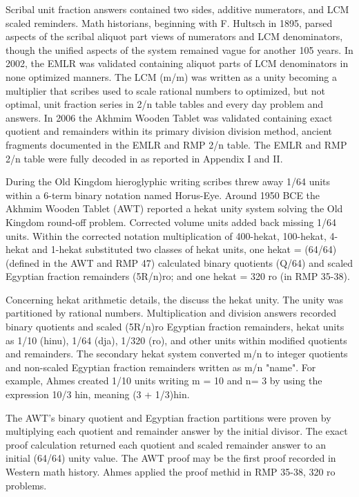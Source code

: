 \documentclass[12pt]{article}
\begin{document}
Scribal unit fraction answers contained two sides, additive numerators, and LCM scaled reminders. Math historians, beginning with F. Hultsch in 1895, parsed aspects of the scribal aliquot part views of numerators and LCM denominators, though the unified aspects of the system remained vague for another 105 years. In 2002, the EMLR was validated containing aliquot parts of LCM denominators in none optimized manners. The LCM (m/m) was written as a unity becoming a multiplier that scribes used to scale rational numbers to optimized, but not optimal, unit fraction series in 2/n table tables and every day problem and answers. In 2006 the Akhmim Wooden Tablet was validated containing exact quotient and remainders within its primary division division method,  ancient fragments documented in the EMLR and RMP 2/n table. The EMLR and RMP 2/n table were fully decoded in  as reported in Appendix I and II.

During the Old Kingdom hieroglyphic writing scribes threw away 1/64 units within a 6-term binary notation named Horus-Eye. Around 1950 BCE the Akhmim Wooden Tablet (AWT) reported a hekat unity system solving the Old Kingdom round-off problem. Corrected volume units added back missing 1/64 units. Within the corrected notation multiplication of 400-hekat, 100-hekat, 4-hekat and 1-hekat substituted two classes of hekat units, one hekat = (64/64) (defined in the AWT and RMP 47) calculated binary quotients (Q/64) and scaled Egyptian fraction remainders (5R/n)ro; and one hekat = 320 ro (in RMP 35-38).
 
Concerning hekat arithmetic details, the  discuss the hekat unity. The unity was partitioned by rational numbers. Multiplication and division answers recorded binary quotients and scaled (5R/n)ro Egyptian fraction remainders, hekat units as 1/10 (hinu), 1/64 (dja), 1/320 (ro), and other units within modified quotients and remainders. The secondary hekat system converted m/n to integer quotients and non-scaled Egyptian fraction remainders written as m/n "name". For example, Ahmes created 1/10 units writing m = 10 and n= 3 by using the expression 10/3 hin, meaning (3 + 1/3)hin.

The AWT's binary quotient and Egyptian fraction partitions were proven by multiplying each quotient and remainder answer by the initial divisor. The exact proof calculation returned each quotient and scaled remainder answer to an initial (64/64) unity value. The AWT proof may be the first proof recorded in Western math history. Ahmes applied the proof methid in RMP 35-38, 320 ro problems. 
\end{document}
